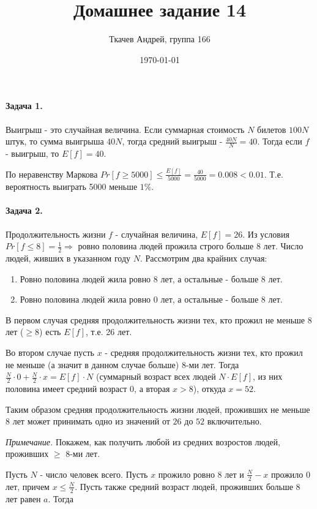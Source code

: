 \documentclass{article}
\title{Домашнее задание 14}
\author{Ткачев Андрей, группа 166}
\date{\today}
\newcommand{\half}[1]{\frac{#1}{2}}
\begin{document}
	\maketitle
	\paragraph{Задача 1.}

    Выигрыш - это случайная величина. Если суммарная стоимость $N$ билетов $100N$ штук, то сумма выигрыша $40N$, тогда средний выигрыш - $\frac{40N}{N} = 40$. Тогда если $f$ - выигрыш, то $E[f] = 40$.

    По неравенству Маркова $Pr[f \ge 5000] \le \frac{E[f]}{5000} = \frac{40}{5000} = 0.008 < 0.01 $. Т.е. вероятность выиграть 5000 меньше $1\%$.

    \paragraph{Задача 2.}
    Продолжительность жизни $f$ - случайная величина, $E[f] = 26$. Из условия $Pr[f \le 8] = \half{1} \Rightarrow$ ровно половина людей прожила строго больше 8 лет.
    Число людей, живших в указанном году $N$. Рассмотрим два крайних случая:

    \begin{enumerate}
        \item Ровно половина людей жила ровно 8 лет, а остальные - больше 8 лет.
        \item Ровно половина людей жила ровно 0 лет, а остальные - больше 8 лет.
    \end{enumerate}

    В первом случая средняя продолжительность жизни тех, кто прожил не меньше 8 лет ($\ge 8$) есть $E[f]$, т.е. 26 лет.

    Во втором случае пусть $x$ - средняя продолжительность жизни тех, кто прожил не меньше (а значит в данном случае больше) 8-ми лет. Тогда $\half{N} \cdot 0  + \half{N} \cdot x = E[f] \cdot N$ (суммарный возраст всех людей $N \cdot E[f]$, из них половина имеет средний возраст 0, а вторая $x > 8$), откуда $x = 52$.

    Таким образом средняя продолжительность жизни людей, проживших не меньше 8 лет может принимать одно из значений от $26$ до $52$ включительно.

    \textit{Примечание.}
    Покажем, как получить любой из средних возростов людей, проживших $\ge$ 8-ми лет. 

    Пусть $N$ - число человек всего. Пусть $x$ прожило ровно 8 лет и $\half{N} - x$ прожило 0 лет, причем $x \le \half{N}$.
    Пусть также средний возраст людей, проживших больше 8 лет равен $a$. Тогда 
\end{document}
